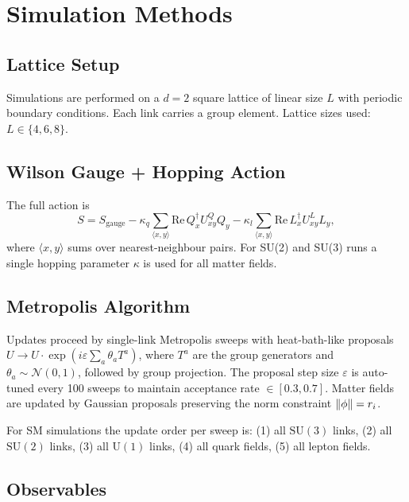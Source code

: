 \documentclass[12pt,a4paper]{article}
\newcommand{\SU}[1]{\mathrm{SU}(#1)}
\newcommand{\UN}[1]{\mathrm{U}(#1)}
\theoremstyle{plain}
\theoremstyle{definition}
\theoremstyle{remark}
\begin{document}
\section{Simulation Methods}
\label{sec:methods}

\subsection{Lattice Setup}

Simulations are performed on a $d=2$ square lattice of linear size $L$ with
periodic boundary conditions.
Each link carries a group element.
Lattice sizes used: $L\in\{4,6,8\}$.

\subsection{Wilson Gauge + Hopping Action}

The full action is
\begin{equation}
  S = S_\text{gauge} - \kappa_q \sum_{\langle x,y\rangle} \mathrm{Re}\, Q_x^\dagger U^Q_{xy} Q_y
                     - \kappa_l \sum_{\langle x,y\rangle} \mathrm{Re}\, L_x^\dagger U^L_{xy} L_y,
\end{equation}
where $\langle x,y\rangle$ sums over nearest-neighbour pairs.
For SU(2) and SU(3) runs a single hopping parameter $\kappa$ is used for all matter
fields.

\subsection{Metropolis Algorithm}

Updates proceed by single-link Metropolis sweeps with heat-bath-like proposals
$U\to U\cdot\exp(i\varepsilon\sum_a\theta_a T^a)$, where $T^a$ are the group generators
and $\theta_a\sim\mathcal{N}(0,1)$, followed by group projection.
The proposal step size $\varepsilon$ is auto-tuned every 100 sweeps to maintain
acceptance rate $\in[0.3,0.7]$.
Matter fields are updated by Gaussian proposals preserving the norm constraint
$\norm{\phi}=r_i$.

For SM simulations the update order per sweep is:
(1) all $\SU{3}$ links, (2) all $\SU{2}$ links, (3) all $\UN{1}$ links,
(4) all quark fields, (5) all lepton fields.

\subsection{Observables}
\label{sec:observables}
\end{document}
